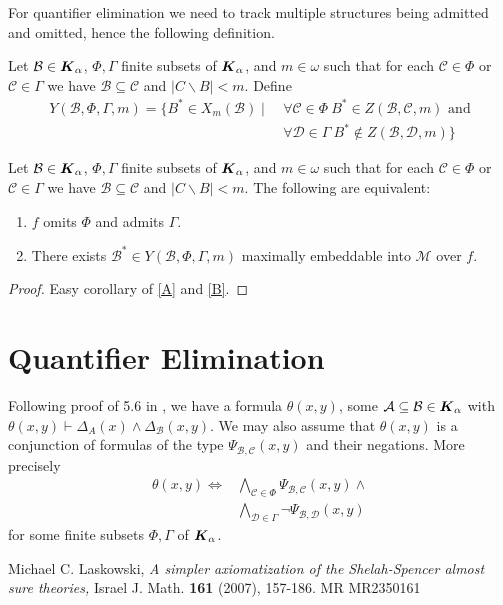 \documentclass{amsart}
\newcommand{\A}{\mathcal A}
\newcommand{\B}{\mathcal B}
\renewcommand{\C}{\mathcal C}
\newcommand{\D}{\mathcal D}
\newcommand{\M}{\mathcal M}
\newcommand{\K}{\boldface K_\alpha}
\begin{document}
For quantifier elimination we need to track multiple structures being admitted and omitted, hence the following definition.

\begin{Definition}
	Let $\B \in \K$, $\Phi, \Gamma$ finite subsets of $\K$, and $m \in \omega$ such that for each $\C \in \Phi$ or $\C \in \Gamma$ we have $\B \subseteq \C$ and $|C \backslash B| < m$. Define
	\begin{align*}
		Y(\B, \Phi, \Gamma, m) = \{B^* \in X_m(\B) \mid \ 	&\forall \C \in \Phi \ B^* \in Z(\B, \C, m) \text{ and}\\
																												&\forall \D \in \Gamma \ B^* \notin Z(\B, \D, m)\}
	\end{align*}
\end{Definition}

\begin{Lemma} \label{C}
	Let $\B \in \K$, $\Phi, \Gamma$ finite subsets of $\K$, and $m \in \omega$ such that for each $\C \in \Phi$ or $\C \in \Gamma$ we have $\B \subseteq \C$ and $|C \backslash B| < m$. The following are equivalent:
	\begin{enumerate}
		\item $f$ omits $\Phi$ and admits $\Gamma$.
		\item There exists $\B^* \in Y(\B, \Phi, \Gamma, m)$ maximally embeddable into $\M$ over $f$.
	\end{enumerate}
\end{Lemma}
\begin{proof}
	Easy corollary of \ref{A} and \ref{B}.
\end{proof}

\section{Quantifier Elimination}

Following proof of 5.6 in \cite{Laskowski}, we have a formula $\theta(x, y)$, some $\A \subseteq \B \in \K$ with $\theta(x, y) \vdash \Delta_A(x) \wedge \Delta_\B(x, y)$. We may also assume that $\theta(x, y)$ is a conjunction of formulas of the type $\Psi_{\B, \C}(x,y)$ and their negations. More precisely
\begin{align*}
	\theta(x, y) \Leftrightarrow 	&\bigwedge_{\C \in \Phi} \Psi_{\B, \C}(x,y) \wedge \\
																&\bigwedge_{\D \in \Gamma} \neg \Psi_{\B, \D}(x,y)
\end{align*}
for some finite subsets $\Phi, \Gamma$ of $\K$.

\begin{thebibliography}{9}

	Michael C. Laskowski, \textsl{A simpler axiomatization of the Shelah-Spencer almost sure theories,}
	Israel J. Math. \textbf{161} (2007), 157-186. MR MR2350161

\end{thebibliography}
\end{document}
